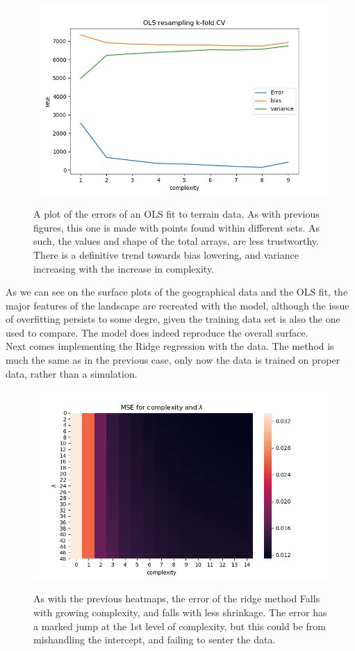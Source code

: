\documentclass[ 12pt, a4paper ]{article}
\begin{document}
\begin{figure}[H]
\includegraphics[scale=0.7]{nordataolsbiasvariancemse.png}
\label{fig:nordataolsbiasvariancemse}
\caption{
    A plot of the errors of an OLS fit to terrain data. As with previous figures, this one
    is made with points found within different sets. As such, the values and shape of the 
    total arrays, are less trustworthy. There is a definitive trend towards bias lowering, 
    and variance increasing with the increase in complexity. 
}
\end{figure}

As we can see on the surface plots of the geographical data and the OLS fit, the major features 
of the landscape are recreated with the model, although the issue of overfitting persists to 
some degre, given the training data set is also the one used to compare. The model does indeed
reproduce the overall surface. \\

Next comes implementing the Ridge regression with the data. The method is much the same as in 
the previous case, only now the data is trained on proper data, rather than a simulation.

\begin{figure}[H]
\includegraphics[scale=0.7]{nordataridgemseheatmap.png}
\label{fig:nordatareidgemseheatmap}
\caption{
    As with the previous heatmaps, the error of the ridge method Falls with growing complexity, 
    and falls with less shrinkage. The error has a marked jump at the 1st level of complexity, 
    but this could be from mishandling the intercept, and failing to senter the data. 
}
\end{figure}
\end{document}
